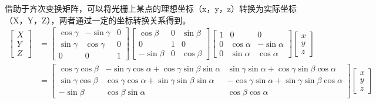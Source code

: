 \documentclass[type=master,oneside]{fduthesis}
\begin{document}
借助于齐次变换矩阵，可以将光栅上某点的理想坐标（x，y，z）转换为实际坐标（X，Y，Z），两者通过一定的坐标转换关系得到。
\begin{equation}
  \begin{aligned}
    \left[\begin{array}{l}
        X \\
        Y \\
        Z
      \end{array}\right]
     & =\left[\begin{array}{ccc}
        \cos \gamma & -\sin \gamma & 0 \\
        \sin \gamma & \cos \gamma  & 0 \\
        0           & 0            & 1
      \end{array}\right]\left[\begin{array}{ccc}
        \cos \beta  & 0 & \sin \beta \\
        0           & 1 & 0          \\
        -\sin \beta & 0 & \cos \beta
      \end{array}\right]\left[\begin{array}{ccc}
        1 & 0           & 0            \\
        0 & \cos \alpha & -\sin \alpha \\
        0 & \sin \alpha & \cos \alpha
      \end{array}\right]\left[\begin{array}{l}
        x \\
        y \\
        z
      \end{array}\right] \\
     & =\left[\begin{array}{cccc}
        \cos \gamma \cos \beta & -\sin \gamma \cos \alpha+\cos \gamma \sin \beta \sin \alpha & \sin \gamma \sin \alpha+\cos \gamma \sin \beta \cos \alpha  \\
        \sin \gamma \cos \beta & \cos \gamma \cos \alpha+\sin \gamma \sin \beta \sin \alpha  & -\cos \gamma \sin \alpha+\sin \gamma \sin \beta \cos \alpha \\
        -\sin \beta            & \cos \beta \sin \alpha                                      & \cos \beta \cos \alpha
      \end{array}\right]\left[\begin{array}{l}
        x \\
        y \\
        z
      \end{array}\right]
  \end{aligned}
\end{equation}
\end{document}
